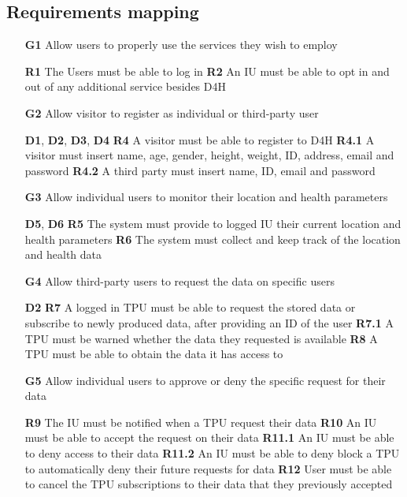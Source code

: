 \subsection{Requirements mapping}
\begin{itemize}
\item [\textbf{G1}] Allow users to properly use the services they wish to employ 

\subitem \textbf{R1} The Users must be able to log in 
\subitem \textbf{R2} An IU must be able to opt in and out of any additional service besides D4H

\item [\textbf{G2}] Allow visitor to register as individual or third-party user 

\subitem \textbf{D1}, \textbf{D2}, \textbf{D3}, \textbf{D4}
\subitem \textbf{R4} A visitor must be able to register to D4H 
\subitem \textbf{R4.1} A visitor must insert name, age, gender, height, weight, ID, address, email and password
\subitem \textbf{R4.2} A third party must insert name, ID, email and password 

\item [\textbf{G3}] Allow individual users to monitor their location and health parameters 

\subitem \textbf{D5}, \textbf{D6}
\subitem \textbf{R5} The system must provide to logged IU their current location and health parameters
\subitem \textbf{R6} The system must collect and keep track of the location and health data

\item [\textbf{G4}] Allow third-party users to request the data on specific users

\subitem \textbf{D2}
\subitem \textbf{R7} A logged in TPU must be able to request the stored data or subscribe to newly produced data, after providing an ID of the user
\subitem \textbf{R7.1} A TPU must be warned whether the data they requested is available
\subitem \textbf{R8} A TPU must be able to obtain the data it has access to 

\item [\textbf{G5}] Allow individual users to approve or deny the specific request for their data

\subitem \textbf{R9} The IU must be notified when a TPU request their data
\subitem \textbf{R10} An IU must be able to accept the request on their data
\subitem \textbf{R11.1} An IU must be able to deny access to their data
\subitem \textbf{R11.2} An IU must be able to deny block a TPU to automatically deny their future requests for data
\subitem \textbf{R12} User must be able to cancel the TPU subscriptions to their data that they previously accepted


\end{itemize}
